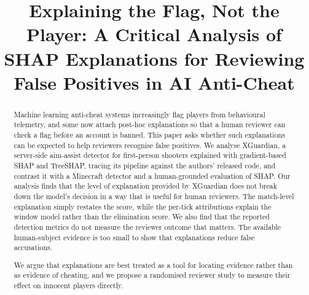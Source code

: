 \documentclass[conference]{IEEEtran}
\begin{document}
\title{Explaining the Flag, Not the Player: A Critical Analysis of SHAP Explanations for Reviewing False Positives in AI Anti-Cheat}

\author{
\and
{}
\and
{}
\and
{}
}

\maketitle

\begin{abstract}
Machine learning anti-cheat systems increasingly flag players from behavioural telemetry, and some now attach post-hoc explanations so that a human reviewer can check a flag before an account is banned. This paper asks whether such explanations can be expected to help reviewers recognise false positives. 
We analyse XGuardian, a server-side aim-assist detector for first-person shooters explained with gradient-based SHAP and TreeSHAP, tracing its pipeline against the authors' released code, and contrast it with a Minecraft detector and a human-grounded evaluation of SHAP. 
Our analysis finds that the level of explanation provided by XGuardian does not break down the model's decision in a way that is useful for human reviewers.
The match-level explanation simply restates the score, while the per-tick attributions explain the window model rather than the elimination score. 
We also find that the reported detection metrics do not measure the reviewer outcome that matters. The available human-subject evidence is too small to show that explanations reduce false accusations.

We argue that explanations are best treated as a tool for locating evidence rather than as evidence of cheating, and we propose a randomised reviewer study to measure their effect on innocent players directly.
\end{abstract}
\end{document}
